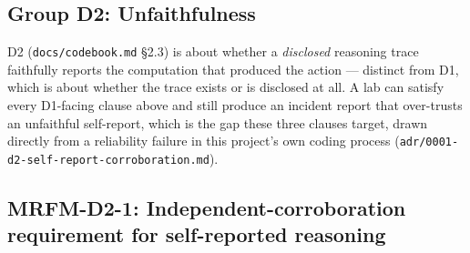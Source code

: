 \subsection*{Group D2: Unfaithfulness}
D2 (\texttt{docs/codebook.md} \S{}2.3) is about whether a \emph{disclosed} reasoning trace faithfully reports the computation that produced the action --- distinct from D1, which is about whether the trace exists or is disclosed at all. A lab can satisfy every D1-facing clause above and still produce an incident report that over-trusts an unfaithful self-report, which is the gap these three clauses target, drawn directly from a reliability failure in this project's own coding process (\texttt{adr/0001-d2-self-report-corroboration.md}).

\subsection*{MRFM-D2-1: Independent-corroboration requirement for self-reported reasoning}
